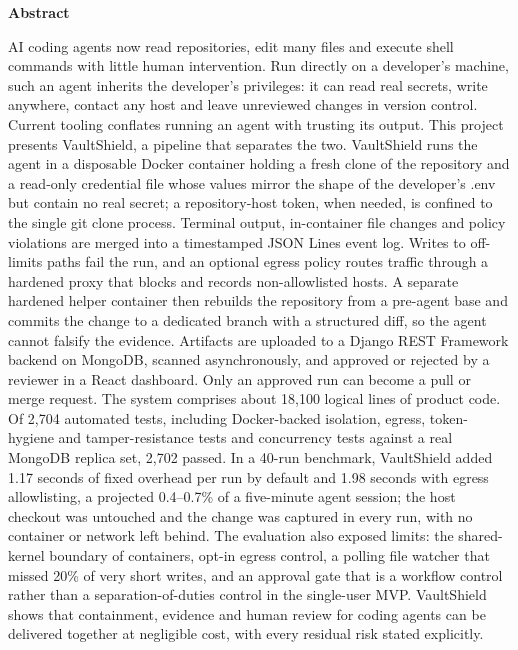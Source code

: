 \documentclass[12pt,a4paper,oneside]{report}
\begin{document}
\thispagestyle{empty}
\vspace*{1.60in}
\begin{center}{\large\bfseries Abstract}\end{center}
\vspace{0.20in}
AI coding agents now read repositories, edit many files and execute shell commands with little human intervention. Run directly on a developer's machine, such an agent inherits the developer's privileges: it can read real secrets, write anywhere, contact any host and leave unreviewed changes in version control. Current tooling conflates running an agent with trusting its output. This project presents VaultShield, a pipeline that separates the two. VaultShield runs the agent in a disposable Docker container holding a fresh clone of the repository and a read-only credential file whose values mirror the shape of the developer's .env but contain no real secret; a repository-host token, when needed, is confined to the single git clone process. Terminal output, in-container file changes and policy violations are merged into a timestamped JSON Lines event log. Writes to off-limits paths fail the run, and an optional egress policy routes traffic through a hardened proxy that blocks and records non-allowlisted hosts. A separate hardened helper container then rebuilds the repository from a pre-agent base and commits the change to a dedicated branch with a structured diff, so the agent cannot falsify the evidence. Artifacts are uploaded to a Django REST Framework backend on MongoDB, scanned asynchronously, and approved or rejected by a reviewer in a React dashboard. Only an approved run can become a pull or merge request. The system comprises about 18,100 logical lines of product code. Of 2,704 automated tests, including Docker-backed isolation, egress, token-hygiene and tamper-resistance tests and concurrency tests against a real MongoDB replica set, 2,702 passed. In a 40-run benchmark, VaultShield added 1.17 seconds of fixed overhead per run by default and 1.98 seconds with egress allowlisting, a projected 0.4--0.7\% of a five-minute agent session; the host checkout was untouched and the change was captured in every run, with no container or network left behind. The evaluation also exposed limits: the shared-kernel boundary of containers, opt-in egress control, a polling file watcher that missed 20\% of very short writes, and an approval gate that is a workflow control rather than a separation-of-duties control in the single-user MVP. VaultShield shows that containment, evidence and human review for coding agents can be delivered together at negligible cost, with every residual risk stated explicitly.
\end{document}
